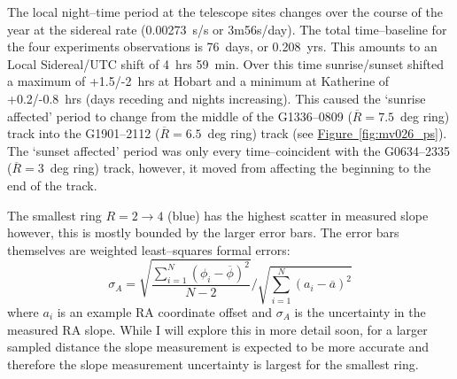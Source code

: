 		The local night--time period at the telescope sites changes over the course of the year at the sidereal rate (0.00273~s/s or 3m56s/day). The total time--baseline for the four experiments observations is 76~days, or 0.208~yrs. This amounts to an Local Sidereal/UTC shift of 4~hrs 59~min. Over this time sunrise/sunset shifted a maximum of +1.5/-2~hrs at Hobart and a minimum at Katherine of +0.2/-0.8~hrs (days receding and nights increasing). This caused the `sunrise affected' period to change from the middle of the G1336--0809 ($\overline{R}=7.5$~deg ring) track into the G1901--2112 ($\overline{R}=6.5$~deg ring) track (see \hyperref[fig:mv026_ps]{Figure~\ref*{fig:mv026_ps}}). The `sunset affected' period was only every time--coincident with the G0634--2335 ($\overline{R}=3$~deg ring) track, however, it moved from affecting the beginning to the end of the track.
		
		The smallest ring $R= 2\rightarrow4$ (blue) has the highest scatter in measured slope however, this is mostly bounded by the larger error bars. The error bars themselves are weighted least--squares formal errors:
		\begin{equation*}
		\sigma_A = \sqrt{\frac{\sum_{i=1}^{N}\left(\phi_i-\overline{\phi}\right)^2}{N-2}} \bigg/ \sqrt{\sum_{i=1}^{N}\left(a_i-\overline{a}\right)^2}
		\end{equation*} where $a_i$ is an example RA coordinate offset and $\sigma_A$ is the uncertainty in the measured RA slope. While I will explore this in more detail soon, for a larger sampled distance the slope measurement is expected to be more accurate and therefore the slope measurement uncertainty is largest for the smallest ring.
		
